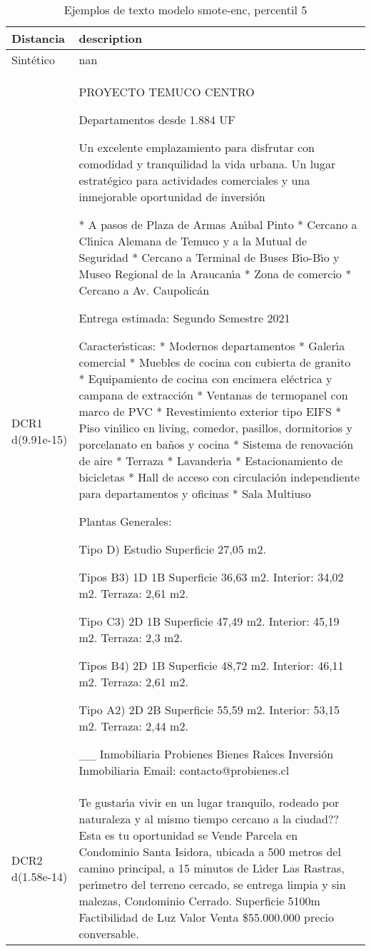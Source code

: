 \begin{table}[H]
\centering
\fontsize{10}{14}\selectfont
\caption{Ejemplos de texto modelo smote-enc, percentil 5}
\label{table-example-economicos-b-3-smote-enc-5p-text}
\begin{tabular}{|l|m{35em}|}
\hline
\rowcolor[gray]{0.8}
Distancia & description \\
\hline Sintético & nan \\
\hline DCR1 d(9.91e-15) & PROYECTO TEMUCO CENTRO

Departamentos desde 1.884 UF

Un excelente emplazamiento para disfrutar con comodidad y tranquilidad la vida urbana.
Un lugar estrat\'egico para actividades comerciales y una inmejorable oportunidad de inversi\'on

* A pasos de Plaza de Armas An{\'\i}bal Pinto
* Cercano a Cl{\'\i}nica Alemana de Temuco y a la Mutual de Seguridad
* Cercano a Terminal de Buses B{\'\i}o-B{\'\i}o y Museo Regional de la Araucan{\'\i}a
* Zona de comercio
* Cercano a Av. Caupolic\'an


Entrega estimada: Segundo Semestre 2021

Caracter{\'\i}sticas:
* Modernos departamentos
* Galer{\'\i}a comercial
* Muebles de cocina con cubierta de granito
* Equipamiento de cocina con encimera el\'ectrica y campana de extracci\'on
* Ventanas de termopanel con marco de PVC
* Revestimiento exterior tipo EIFS
* Piso vin{\'\i}lico en living, comedor, pasillos, dormitorios y porcelanato en ba\~nos y cocina
* Sistema de renovaci\'on de aire
* Terraza
* Lavander{\'\i}a
* Estacionamiento de bicicletas
* Hall de acceso con circulaci\'on independiente para departamentos y oficinas
* Sala Multiuso


Plantas Generales:

Tipo D) Estudio
Superficie 27,05 m2.

Tipos B3) 1D 1B
Superficie 36,63 m2. Interior: 34,02 m2. Terraza: 2,61 m2.

Tipo C3) 2D 1B
Superficie 47,49 m2. Interior: 45,19 m2. Terraza: 2,3 m2.

Tipos B4) 2D 1B
Superficie 48,72 m2. Interior: 46,11 m2. Terraza: 2,61 m2.

Tipo A2) 2D 2B
Superficie 55,59 m2. Interior: 53,15 m2. Terraza: 2,44 m2.



 \_\_ 
Inmobiliaria Probienes
 Bienes Ra{\'\i}ces
Inversi\'on Inmobiliaria 
Email: contacto@probienes.cl \\
\hline DCR2 d(1.58e-14) & Te gustar{\'\i}a vivir en un lugar tranquilo, rodeado por naturaleza y al mismo tiempo cercano a la ciudad?? Esta es tu oportunidad se Vende Parcela en Condominio Santa Isidora, ubicada a 500 metros del camino principal, a 15 minutos de L{\'\i}der Las Rastras, per{\'\i}metro del terreno cercado, se entrega limpia y sin malezas, Condominio Cerrado.  Superficie 5100m Factibilidad de Luz  Valor Venta \$55.000.000 precio conversable. \\
\hline
\end{tabular}
\end{table}
